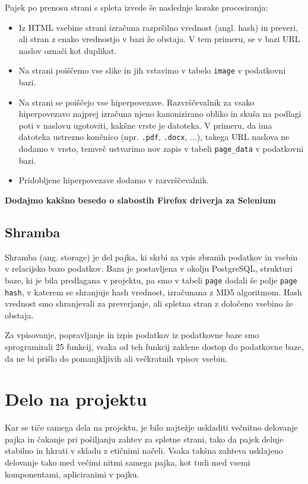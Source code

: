 \documentclass[conference]{IEEEtran}
\begin{document}
	Pajek po prenosu strani s spleta izvede še naslednje korake procesiranja:
	\begin{itemize}
		\item Iz HTML vsebine strani izračuna razpršilno vrednost (angl. hash) in preveri, ali stran z enako vrednostjo v bazi že obstaja. V tem primeru, se v bazi URL naslov označi kot duplikat.
		\item Na strani poiščemo vse slike in jih vstavimo v tabelo \texttt{image} v podatkovni bazi.
		\item Na strani se poiščejo vse hiperpovezave. Razvrščevalnik za vsako hiperpovezavo najprej izračuna njeno kanonizirano obliko in skuša na podlagi poti v naslovu ugotoviti, kakšne vrste je datoteka. V primeru, da ima datoteka ustrezno končnico (npr. \texttt{.pdf}, \texttt{.docx}, ...), takega URL naslova ne dodamo v vrsto, temveč ustvarimo nov zapis v tabeli \texttt{page\_data} v podatkovni bazi.
		\item Pridobljene hiperpovezave dodamo v razvrščevalnik.
	\end{itemize}

	\textbf{Dodajmo kakšno besedo o slabostih Firefox driverja za Selenium}
	
	\subsection{Shramba}
	
	Shramba (ang. storage) je del pajka, ki skrbi za vpis zbranih podatkov in vsebin v relacijsko bazo podatkov. Baza je postavljena v okolju PostgreSQL, strukturi baze, ki je bila predlagana v projektu, pa smo v tabeli \texttt{page} dodali še polje \texttt{page hash}, v katerem se shranjuje hash vrednost, izračunana z MD5 algoritmom. Hash vrednost smo shranjevali za preverjanje, ali spletna stran z določeno vsebino že obstaja. 
	
	Za vpisovanje, popravljanje in izpis podatkov iz podatkovne baze smo sprogramirali 25 funkcij, vsaka od teh funkcij zaklene dostop do podatkovne baze, da ne bi prišlo do pomanjkljivih ali večkratnih vpisov vsebin.
	
	\section{Delo na projektu}
	
	Kar se tiče samega dela na projektu, je bilo najtežje uskladiti večnitno delovanje pajka in čakanje pri pošiljanju zahtev za spletne strani, tako da pajek deluje stabilno in hkrati v skladu z etičnimi načeli. Vsaka takšna zahteva usklajeno delovanje tako med večimi nitmi samega pajka, kot tudi med vsemi komponentami, apliciranimi v pajku.
	
\end{document}

